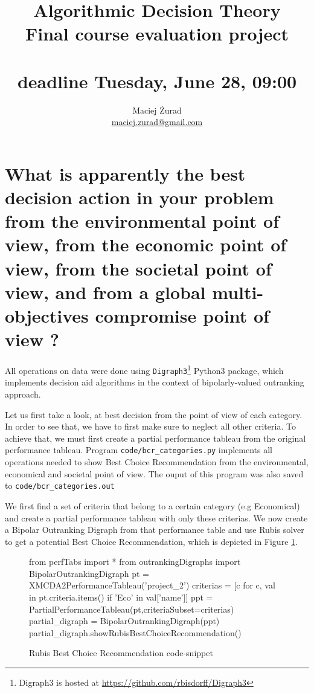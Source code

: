\documentclass[a4paper]{article}
\begin{document}
 \title{\textbf{Algorithmic Decision Theory} \\ Final course evaluation project
 \\  ~\\ \normalsize{deadline Tuesday, June 28, 09:00}}
 \author{Maciej Żurad \\ \url{maciej.zurad@gmail.com}}

\date{}

\maketitle



\section{What is apparently the best decision action in your problem from the environmental point of view, from the economic point of view, from the societal point of view, and from a global multi-objectives compromise point of view ?}

All operations on data were done using \texttt{Digraph3}\footnote{Digraph3 is hosted at \url{https://github.com/rbisdorff/Digraph3}} Python3 package, which implements decision aid algorithms in the context of bipolarly-valued outranking approach.

Let us first take a look, at best decision from the point of view of each category. In order to see that, we have to first make sure to neglect all other criteria. To achieve that, we must first create a partial performance tableau from the original performance tableau. Program \texttt{code/bcr\_categories.py} implements all operations needed to show Best Choice Recommendation from the environmental, economical and societal point of view. The ouput of this program was also saved to \texttt{code/bcr\_categories.out}

We first find a set of criteria that belong to a certain category (e.g Economical) and create a partial performance tableau with only these criterias. We now create a Bipolar Outranking Digraph from that performance table and use Rubis\cite{bisdorff2008r, bisdorff2006choices} solver to get a potential Best Choice Recommendation, which is depicted in Figure \ref{lst:rubis}.

\begin{figure}[H]
\begin{center}
\begin{python}
from perfTabs import *
from outrankingDigraphs import BipolarOutrankingDigraph
pt = XMCDA2PerformanceTableau('project_2')
criterias = [c for c, val in pt.criteria.items() if 'Eco' in val['name']]
ppt = PartialPerformanceTableau(pt,criteriaSubset=criterias)
partial_digraph = BipolarOutrankingDigraph(ppt)
partial_digraph.showRubisBestChoiceRecommendation()
\end{python}
\end{center}
\caption{Rubis Best Choice Recommendation code-snippet}
\label{lst:rubis}
\end{figure}
\end{document}
